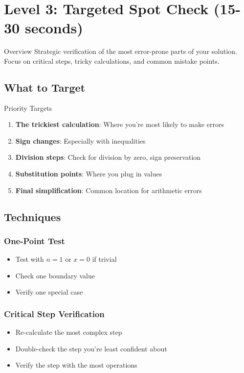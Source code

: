 \documentclass{article}
\begin{document}
\newpage

\section{Level 3: Targeted Spot Check (15-30 seconds)}

\begin{targetedbox}{Overview}
Strategic verification of the most error-prone parts of your solution. Focus on critical steps, tricky calculations, and common mistake points.
\end{targetedbox}

\subsection{What to Target}

\begin{targetedbox}{Priority Targets}
\begin{enumerate}
\item \textbf{The trickiest calculation}: Where you're most likely to make errors
\item \textbf{Sign changes}: Especially with inequalities
\item \textbf{Division steps}: Check for division by zero, sign preservation
\item \textbf{Substitution points}: Where you plug in values
\item \textbf{Final simplification}: Common location for arithmetic errors
\end{enumerate}
\end{targetedbox}

\subsection{Techniques}

\subsubsection{One-Point Test}
\begin{itemize}
\item Test with $n = 1$ or $x = 0$ if trivial
\item Check one boundary value
\item Verify one special case
\end{itemize}

\subsubsection{Critical Step Verification}
\begin{itemize}
\item Re-calculate the most complex step
\item Double-check the step you're least confident about
\item Verify the step with the most operations
\end{itemize}
\end{document}
